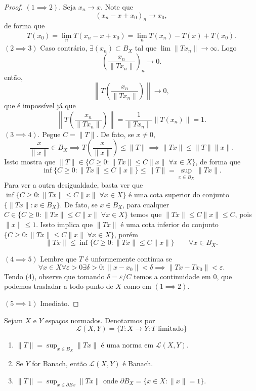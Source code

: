 \documentclass[portuguese]{article}
\theoremstyle{definition}
\begin{document}
	\begin{proof}
		$(1\implies 2)$. Seja $x_n\to x$. Note que
		\[(x_n-x+x_0)_n\to x_0,\]
		de forma que
		\begin{align*}
			T(x_0)=\lim_n T(x_n-x+x_0)=\lim_n T(x_n)-T(x)+T(x_0).
		\end{align*}
		$(2\implies 3)$ Caso contrário, $\exists(x_n)\subset B_X$ tal que $\lim \| Tx_n\|\to \infty$. Logo
		\[\left(\frac{x_n}{\| Tx_n\|}\right)_n\to0.\]
		então,
		\[\left\| T\left(\frac{x_n}{\| Tx_n\|}\right)\right\|\to0,\]
		que é impossível já que
		\[\left\| T\left(\frac{x_n}{\| Tx_n\|}\right)\right\|=\frac{1}{\| Tx_n\|}\| T(x_n)\|=1.\]
		$(3\implies 4)$. Pegue $C=\| T\|$. De fato, se $x\neq0$,
		\[\frac{x}{\| x\|}\in B_X\implies T\left(\frac{x}{\| x\|}\right)\leq\| T\|\implies\| Tx\|\leq\| T\|\| x\|.\]
		Issto mostra que $\| T\|\in\{C\geq0:\| Tx\|\leq C\| x\|\;\forall x\in X\}$, de forma que 
		\[\inf\{C\geq0:\| Tx\|\leq C\| x\|\}\leq\| T\|=\sup_{x\in B_X}\| Tx\|.\]
		Para ver a outra desigualdade, basta ver que $\inf\{C\geq0:\| Tx\|\leq C\| x\|\;\forall x\in X\}$ é uma cota superior do conjunto $\{\| Tx\|:x\in B_X\}$. De fato, se $x\in B_X$, para cualquer $C\in\{C\geq0:\| Tx\|\leq C\| x\|\;\forall x\in X\}$ temos que $\| Tx\|\leq C\| x\|\leq C$, pois $\| x\|\leq1$. Issto implica que $\| Tx\|$ é uma cota inferior do conjunto $\{C\geq0:\| Tx\|\leq C\| x\|\;\forall x\in X\}$, porém
		\[\| Tx\|\leq\inf\{C\geq0:\| Tx\|\leq C\| x\|\}\qquad\forall x\in B_X.\]
		
		$(4\implies 5)$ Lembre que $T$ é unformemente contínua se \[\forall x\in X\forall\varepsilon>0\exists \delta>0:\| x-x_0\|<\delta\implies\| Tx-Tx_0\|<\varepsilon.\]
		Tendo (4), observe que tomando $\delta=\varepsilon/C$ temos a continuidade em $0$, que podemos trasladar a todo punto de $X$ como em $(1\implies 2)$.
		
		$(5\implies 1)$ Imediato.
	\end{proof}
	\begin{defn}
		Sejam $X$ e $Y$ espaços normados. Denotarmos por
		\[\mathcal{L}(X,Y)=\{T:X\to Y:T\text{ limitado}\}\]
	\end{defn}
	\begin{exer}[Tareia]\leavevmode
		\begin{enumerate}
			\item $\| T\|=\sup_{x\in B_X}\| Tx\|$ é uma norma em $\mathcal{L}(X,Y)$.
			\item Se $Y$ for Banach, então $\mathcal{L}(X,Y)$ é Banach.
			\item $\| T\|=\sup_{x\in \partial Bx}\| Tx\|$ onde $\partial B_X=\{x\in X:\| x\|=1\}$.
		\end{enumerate}
	\end{exer}
	
\end{document}
